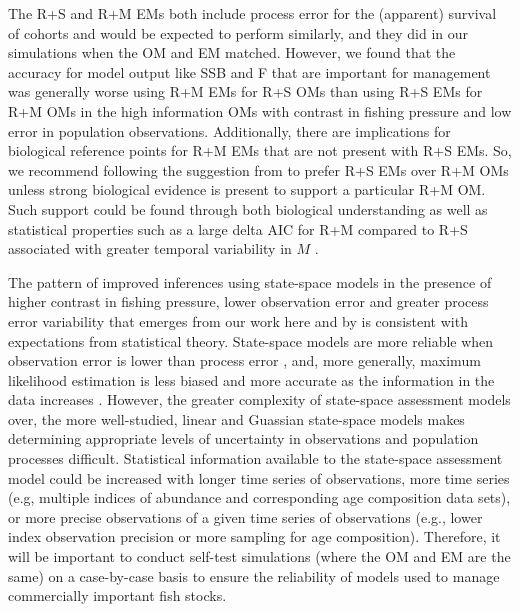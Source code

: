\documentclass[
  12pt,
]{article}
\begin{document}
The R+S and R+M EMs both include process error for the (apparent) survival of cohorts and would be expected to perform similarly, and they did in our simulations when the OM and EM matched. However, we found that the accuracy for model output like SSB and F that are important for management was generally worse using R+M EMs for R+S OMs than using R+S EMs for R+M OMs in the high information OMs with contrast in fishing pressure and low error in population observations. Additionally, there are implications for biological reference points for R+M EMs \citep[e.g.,][]{legaultpalmer16} that are not present with R+S EMs. So, we recommend following the suggestion from \citet{lietal24} to prefer R+S EMs over R+M OMs unless strong biological evidence is present to support a particular R+M OM. Such support could be found through both biological understanding \citep[e.g.,][]{trijouletetal20} as well as statistical properties such as a large delta AIC for R+M compared to R+S associated with greater temporal variability in \(M\) \citep{milleretal_inreview1}.

The pattern of improved inferences using state-space models in the presence of higher contrast in fishing pressure, lower observation error and greater process error variability that emerges from our work here and by \citet{milleretalinreview} is consistent with expectations from statistical theory. State-space models are more reliable when observation error is lower than process error \citep{augermetheetal16}, and, more generally, maximum likelihood estimation is less biased and more accurate as the information in the data increases \citep{neymanscott48, kieferwolfowitz56}. However, the greater complexity of state-space assessment models over, the more well-studied, linear and Guassian state-space models makes determining appropriate levels of uncertainty in observations and population processes difficult. Statistical information available to the state-space assessment model could be increased with longer time series of observations, more time series (e.g, multiple indices of abundance and corresponding age composition data sets), or more precise observations of a given time series of observations (e.g., lower index observation precision or more sampling for age composition). Therefore, it will be important to conduct self-test simulations (where the OM and EM are the same) on a case-by-case basis to ensure the reliability of models used to manage commercially important fish stocks.
\end{document}
